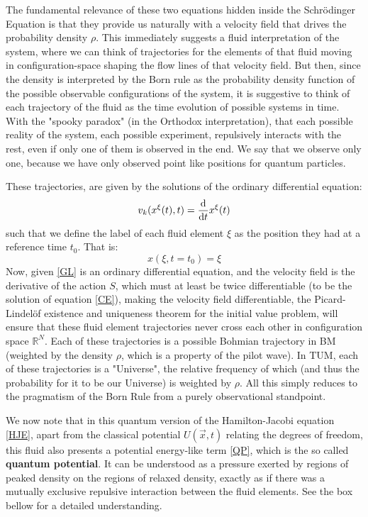 \documentclass[11pt, a4paper]{article} %
\newcommand{\R}{\mathbb{R}} %
\begin{document}
The fundamental relevance of these two equations hidden inside the Schrödinger Equation is that they provide us naturally with a velocity field that drives the probability density $\rho$. This immediately suggests a fluid interpretation of the system, where we can think of trajectories for the elements of that fluid moving in configuration-space shaping the flow lines of that velocity field. But then, since the density is interpreted by the Born rule as the probability density function of the possible observable configurations of the system, it is suggestive to think of each trajectory of the fluid  as the time evolution of possible systems in time. With the "spooky paradox" (in the Orthodox interpretation), that each possible reality of the system, each possible experiment, repulsively interacts with the rest, even if only one of them is observed in the end. We say that we observe only one, because we have only observed point like positions for quantum particles.

 These trajectories, are given by the solutions of the ordinary differential equation:
\begin{equation}\label{GL}
v_k(x^\xi(t),t)=\dv{}{t}x^\xi(t)
\end{equation}
such that we define the label of each fluid element $\xi$ as the position they had at a reference time $t_0$. That is:
\begin{equation}
x(\xi,t=t_0)=\xi
\end{equation}
Now, given \eqref{GL} is an ordinary differential equation, and the velocity field is the derivative of the action $S$, which must at least be twice differentiable (to be the solution of equation \eqref{CE}), making the velocity field differentiable, the Picard-Lindelöf existence and uniqueness theorem for the initial value problem, will ensure that these fluid element trajectories never cross each other in configuration space $\R^N$. Each of these trajectories is a possible Bohmian trajectory in BM (weighted by the density $\rho$, which is a property of the pilot wave). In TUM, each of these trajectories is a "Universe", the relative frequency of which (and thus the probability for it to be our Universe) is weighted by $\rho$. All this simply reduces to the pragmatism of the Born Rule from a purely observational standpoint.

We now note that in this quantum version of the Hamilton-Jacobi equation \eqref{HJE}, apart from the classical potential $U(\vec{x},t)$ relating the degrees of freedom, this fluid also presents a potential energy-like term \eqref{QP}, which is the so called {\bf quantum potential}. It can be understood as a pressure exerted by regions of peaked density on the regions of relaxed density, exactly as if there was a mutually exclusive repulsive interaction between the fluid elements. See the box bellow for a detailed understanding.
\vspace{+0.3cm}
\end{document}
